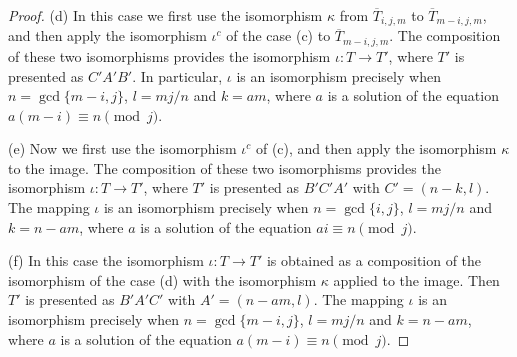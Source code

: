 \documentclass[12pt]{amsart}
\newcommand{\ovT}{\overline{T}}
\theoremstyle{plain}
\theoremstyle{definition}
\numberwithin{equation}{section}
\begin{document}
\begin{proof}
(d) In this case we first use the isomorphism $\kappa$ from $\ovT_{i,j,m}$ to $\ovT_{m-i,j,m}$, and
then apply the isomorphism $\iota^c$ of the case (c) to $\ovT_{m-i,j,m}$. The composition of
these two isomorphisms provides the isomorphism $\iota:T \rightarrow T'$, where $T'$ is
presented as $C'A'B'$. In particular, $\iota$ is an isomorphism precisely when $n =
\gcd\{m-i,j\}$, $l = mj/n$ and $k = am$, where $a$ is a solution of the equation $a(m-i) \equiv n \pmod{j}$.

(e) Now we first use the isomorphism $\iota^c$ of (c), and then apply the isomorphism $\kappa$
to the image. The composition of these two isomorphisms provides the isomorphism $\iota:T
\rightarrow T'$, where $T'$ is presented as $B'C'A'$ with $C' = (n-k,l)$. The mapping $\iota$ is an isomorphism precisely when
$n = \gcd\{i,j\}$, $l = mj/n$ and $k = n-am$, where $a$ is a solution of the equation $ai \equiv n \pmod{j}$.

(f) In this case the isomorphism $\iota:T \rightarrow T'$ is obtained as a composition of the
isomorphism of the case (d) with the isomorphism $\kappa$ applied to the image. Then $T'$ is
presented as $B'A'C'$ with $A' = (n-am,l)$. The mapping $\iota$ is an isomorphism precisely when
$n = \gcd\{m-i,j\}$, $l = mj/n$ and $k = n-am$, where $a$ is a solution of the equation $a(m-i) \equiv n \pmod{j}$.
\end{proof}
\end{document}
